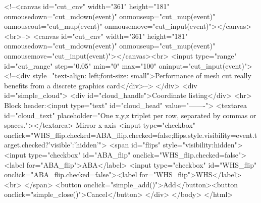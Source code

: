             <!--<canvas id="cut_cnv" width="361" height="181" onmousedown="cut_mdown(event)" onmouseup="cut_mup(event)" onmouseout="cut_mup(event)" onmousemove="cut_input(event)"></canvas><br>-->
            <canvas id="cut_cnv" width="361" height="181" onmousedown="cut_mdown(event)" onmouseup="cut_mup(event)" onmousemove="cut_input(event)"></canvas><br>
            <input type="range" id="cut_range" step="0.05" min="0" max="100" oninput="cut_input(event)">
            <!--<div style="text-align: left;font-size: small">Performance of mesh cut really benefits from a discrete graphics card</div>-->
        </div>
        <div id="simple_cloud">
            <div id="cloud_handle">Coordinate listing</div>
            <hr>
            Block header:<input type="text" id="cloud_head" value="-------">
            <textarea id="cloud_text" placeholder="One x,y,z triplet per row, separated by commas or spaces."></textarea>
            Mirror x-axis
            <input type="checkbox" onclick="WHS_flip.checked=ABA_flip.checked=false;flips.style.visibility=event.target.checked?'visible':'hidden'">
            <span id="flips" style="visibility:hidden">
                <input type="checkbox" id="ABA_flip" onclick="WHS_flip.checked=false"><label for="ABA_flip">ABA</label>
                <input type="checkbox" id="WHS_flip" onclick="ABA_flip.checked=false"><label for="WHS_flip">WHS</label><br>
            </span>
            <button onclick="simple_add()">Add</button><button onclick="simple_close()">Cancel</button>
        </div>
    </body>
</html>
